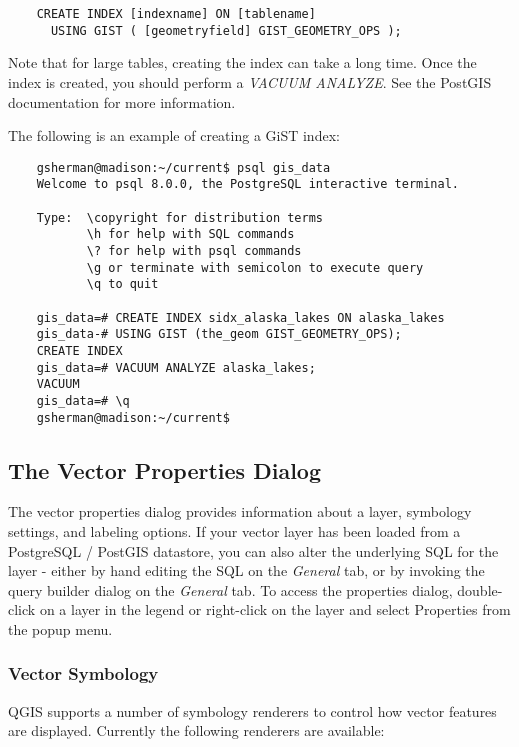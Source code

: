 \begin{verbatim}
    CREATE INDEX [indexname] ON [tablename] 
      USING GIST ( [geometryfield] GIST_GEOMETRY_OPS );
\end{verbatim}

Note that for large tables, creating the index can take a long time. Once the
index is created, you should perform a \textit{VACUUM ANALYZE}. See the
PostGIS documentation for more information.

The following is an example of creating a GiST index:
\begin{verbatim}
    gsherman@madison:~/current$ psql gis_data
    Welcome to psql 8.0.0, the PostgreSQL interactive terminal.

    Type:  \copyright for distribution terms
           \h for help with SQL commands
           \? for help with psql commands
           \g or terminate with semicolon to execute query
           \q to quit

    gis_data=# CREATE INDEX sidx_alaska_lakes ON alaska_lakes
    gis_data-# USING GIST (the_geom GIST_GEOMETRY_OPS);
    CREATE INDEX
    gis_data=# VACUUM ANALYZE alaska_lakes;
    VACUUM
    gis_data=# \q
    gsherman@madison:~/current$
\end{verbatim}

\subsection{The Vector Properties Dialog}\label{sec:vectorprops}

The vector properties dialog provides information about a layer, symbology
settings, and labeling options. If your vector layer has been loaded from a
PostgreSQL / PostGIS datastore, you can also alter the underlying SQL for the
layer - either by hand editing the SQL on the \textit{General} tab, or by
invoking the query builder dialog on the \textit{General} tab. To access the
properties dialog, double-click on a layer in the legend or right-click on the
layer and select Properties from the popup menu.

\subsubsection{Vector Symbology}\label{sec:symbology}

QGIS supports a number of symbology renderers to control how
vector features are displayed. Currently the following renderers
are available:

